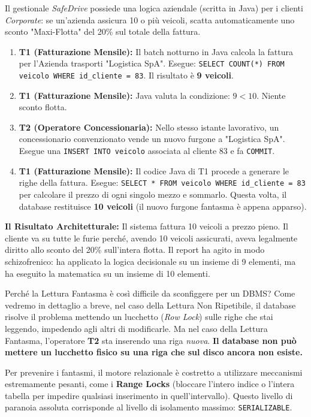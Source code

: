 \begin{example}
Il gestionale \textit{SafeDrive} possiede una logica aziendale (scritta in Java) per i clienti \textit{Corporate}: se un'azienda assicura 10 o più veicoli, scatta automaticamente uno sconto "Maxi-Flotta" del 20\% sul totale della fattura.
\begin{enumerate}
    \item \textbf{T1 (Fatturazione Mensile):} Il batch notturno in Java calcola la fattura per l'Azienda trasporti "Logistica SpA". Esegue: \texttt{SELECT COUNT(*) FROM veicolo WHERE id\_cliente = 83}. Il risultato è \textbf{9 veicoli}.
    \item \textbf{T1 (Fatturazione Mensile):} Java valuta la condizione: $9 < 10$. Niente sconto flotta.
    \item \textbf{T2 (Operatore Concessionaria):} Nello stesso istante lavorativo, un concessionario convenzionato vende un nuovo furgone a "Logistica SpA". Esegue una \texttt{INSERT INTO veicolo} associata al cliente 83 e fa \texttt{COMMIT}.
    \item \textbf{T1 (Fatturazione Mensile):} Il codice Java di T1 procede a generare le righe della fattura. Esegue: \texttt{SELECT * FROM veicolo WHERE id\_cliente = 83} per calcolare il prezzo di ogni singolo mezzo e sommarlo. Questa volta, il database restituisce \textbf{10 veicoli} (il nuovo furgone fantasma è appena apparso).
\end{enumerate}

\textbf{Il Risultato Architetturale:} Il sistema fattura 10 veicoli a prezzo pieno. Il cliente va su tutte le furie perché, avendo 10 veicoli assicurati, aveva legalmente diritto allo sconto del 20\% sull'intera flotta. Il report ha agito in modo schizofrenico: ha applicato la logica decisionale su un insieme di 9 elementi, ma ha eseguito la matematica su un insieme di 10 elementi.
\end{example}

Perché la Lettura Fantasma è così difficile da sconfiggere per un DBMS? 
Come vedremo in dettaglio a breve, nel caso della Lettura Non Ripetibile, il database risolve il problema mettendo un lucchetto (\textit{Row Lock}) sulle righe che stai leggendo, impedendo agli altri di modificarle. 
Ma nel caso della Lettura Fantasma, l'operatore \textbf{T2} sta inserendo una riga \textit{nuova}. \textbf{Il database non può mettere un lucchetto fisico su una riga che sul disco ancora non esiste.} 

Per prevenire i fantasmi, il motore relazionale è costretto a utilizzare meccanismi estremamente pesanti, come i \textbf{Range Locks} (bloccare l'intero indice o l'intera tabella per impedire qualsiasi inserimento in quell'intervallo). Questo livello di paranoia assoluta corrisponde al livello di isolamento massimo: \texttt{SERIALIZABLE}.


